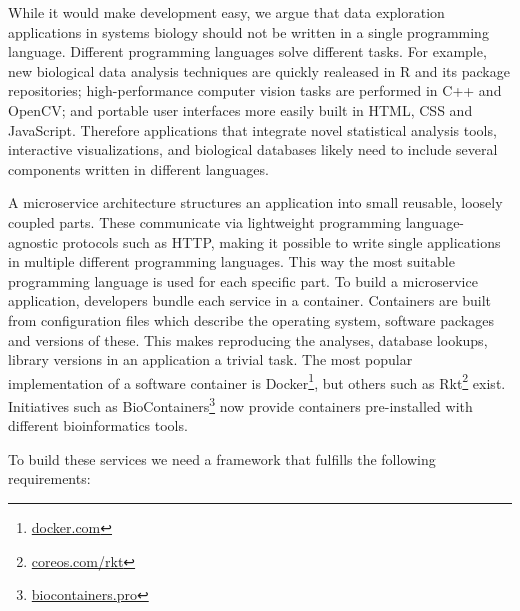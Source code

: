 While it would make development easy, we argue that data exploration
applications in systems biology should not be written in a single programming
language.  Different programming languages solve different tasks.  For example,
new biological data analysis techniques are quickly realeased in R and its
package repositories; high-performance computer vision tasks are performed in
C++ and OpenCV; and portable user interfaces more easily built in HTML, CSS and
JavaScript.  Therefore applications that integrate novel statistical analysis
tools, interactive visualizations, and biological databases likely need to
include several components written in different languages. 


A microservice architecture structures an application into small reusable,
loosely coupled parts. These communicate via lightweight programming
language-agnostic protocols such as HTTP, making it possible to write single
applications in multiple different programming languages. This way the
most suitable programming language is used for each specific part. To build a
microservice application, developers bundle each service in a container.
Containers are built from configuration files which describe the operating
system, software packages and versions of these. 
This makes reproducing the analyses, database lookups, library versions in an
application a trivial task. The most popular implementation of a software
container is Docker\footnote{\url{docker.com}}, but others such as
Rkt\footnote{\url{coreos.com/rkt}} exist. Initiatives such as
BioContainers\footnote{\url{biocontainers.pro}} now provide containers
pre-installed with different bioinformatics tools. 

To build these services we need a framework that fulfills the following
requirements: 

